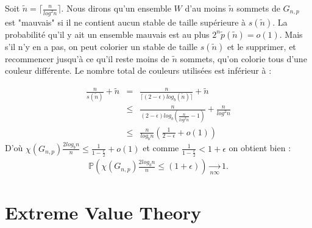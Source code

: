 Soit $\tilde n = \lceil{\frac{n}{log^2 n}}\rceil$.
Nous dirons qu'un ensemble $W$ d'au moins $\tilde n$ sommets de $G_{n,p}$ est "mauvais" si il ne contient aucun stable de taille supérieure à $s(\tilde n)$.
La probabilité qu'il y ait un ensemble mauvais est au plus $2^n\tilde p(\tilde n)=o(1)$.
Mais s'il n'y en a pas, on peut colorier un stable de taille $s(\tilde n)$ et le supprimer, et recommencer jusqu'à ce qu'il reste moins de $\tilde n$ sommets, qu'on colorie tous d'une couleur différente.
Le nombre total de couleurs utilisées est inférieur à :

\begin{eqnarray*} 
\frac{n}{s(\tilde n)} + \tilde n &=& \frac{n}{\lceil(2-\epsilon)log_b(\tilde n) \rceil} + \tilde n \\
&\leq& \frac{n}{(2-\epsilon)log_b(\frac{n}{log^2n}-1)} + \frac{n}{log^2n}\\
&\leq& \frac{n}{log_bn}(\frac{1}{2-\epsilon} + o(1))
\end{eqnarray*}
D'où $\chi(G_{n,p}) \frac{2log_bn}{n} \leq \frac{1}{1-\frac{\epsilon}{2}} + o(1)$ et comme $\frac{1}{1-\frac{\epsilon}{2}} < 1+\epsilon $ on obtient bien :
\begin{eqnarray*}
\mathbb{P} (\chi(G_{n,p})\frac{2log_bn}{n} \leq (1+\epsilon)) \xrightarrow[n \infty]{} 1.
\end{eqnarray*}

\chapter{Extreme Value Theory}
